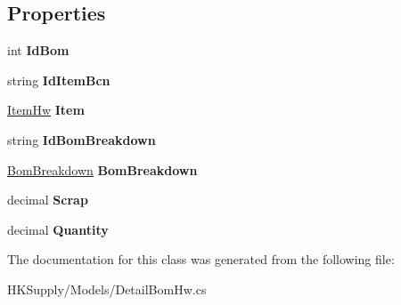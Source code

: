 \subsection*{Properties}
\begin{DoxyCompactItemize}
\item 
\mbox{\label{class_h_k_supply_1_1_models_1_1_detail_bom_hw_adb26877d34f8cf43e0d39fbd637684d3}} 
int {\bfseries Id\+Bom}
\item 
\mbox{\label{class_h_k_supply_1_1_models_1_1_detail_bom_hw_a8d080e555cd55c154deaa01463f8ff37}} 
string {\bfseries Id\+Item\+Bcn}
\item 
\mbox{\label{class_h_k_supply_1_1_models_1_1_detail_bom_hw_a374844477a527d1bb679c8611bc48451}} 
\mbox{\hyperlink{class_h_k_supply_1_1_models_1_1_item_hw}{Item\+Hw}} {\bfseries Item}
\item 
\mbox{\label{class_h_k_supply_1_1_models_1_1_detail_bom_hw_aca6c54c0f4b71b563a6bb25bc0679c73}} 
string {\bfseries Id\+Bom\+Breakdown}
\item 
\mbox{\label{class_h_k_supply_1_1_models_1_1_detail_bom_hw_a99248775d81c17e099abe29663a69c99}} 
\mbox{\hyperlink{class_h_k_supply_1_1_models_1_1_bom_breakdown}{Bom\+Breakdown}} {\bfseries Bom\+Breakdown}
\item 
\mbox{\label{class_h_k_supply_1_1_models_1_1_detail_bom_hw_a0ca10df8c9b2d36f51881893c84f2524}} 
decimal {\bfseries Scrap}
\item 
\mbox{\label{class_h_k_supply_1_1_models_1_1_detail_bom_hw_ade5679e7d09bcb60860edee0b9523de6}} 
decimal {\bfseries Quantity}
\end{DoxyCompactItemize}


The documentation for this class was generated from the following file\+:\begin{DoxyCompactItemize}
\item 
H\+K\+Supply/\+Models/Detail\+Bom\+Hw.\+cs\end{DoxyCompactItemize}

